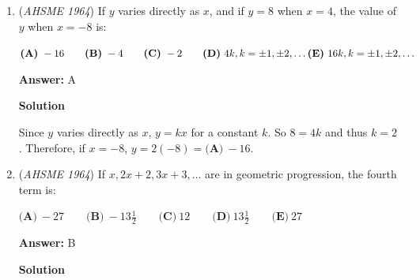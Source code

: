 \begin{enumerate}
 



\textbf{Solution 2}

Notice that $\frac{P+Q}{P-Q} - \frac{P-Q}{P+Q} = \frac{(P+Q)^2 - (P - Q)^2}{(P-Q)(P+Q)} = \frac{(2P)(2Q)}{(P-Q)(P+Q)} = \frac{4PQ}{(P-Q)(P+Q)}$.

 Substituting for $P$ and $Q$ yields $\frac{4(x^2 - y^2)}{(2y)(2x)}=\frac{4(x^2 - y^2)}{4xy} = \boxed{\textbf{(A)} \frac{x^2 - y^2}{xy}}$.

 



\textbf{Solution 3}

If it's true for all values of $x$ and $y$, then it's true for a specific value of $x$ and $y$.  Letting $x=5$ and $y = 4$ gives $P = 9$ and $Q = 1$.  The fraction becomes:

 $\frac{9 + 1}{9 - 1} - \frac{9 - 1}{9 + 1}$
$\frac{10}{8} - \frac{8}{10}$
$\frac{5}{4} - \frac{4}{5}$
$\frac{25}{20} - \frac{16}{20}$
$\frac{9}{20}$

 Plugging in $(x, y) = (5, 4)$ into the answer choices gives $\frac{9}{20}, \frac{9}{40}, 1, \frac{41}{20}, \frac{41}{40}$.  Therefore, the answer is $\boxed{\textbf{(A)}}$



	\item (\textit{AHSME 1964}) If $y$ varies directly as $x$, and if $y=8$ when $x=4$, the value of $y$ when $x=-8$ is:


 $\textbf{(A)}\ -16 \qquad \textbf{(B)}\ -4 \qquad \textbf{(C)}\ -2 \qquad \textbf{(D)}\ 4k, k= \pm1, \pm2, \dots \qquad \\ \textbf{(E)}\ 16k, k=\pm1,\pm2,\dots$

 \textbf{Answer: }A



\textbf{Solution}

Since $y$ varies directly as $x$, $y = kx$ for a constant $k$.  So $8 = 4k$ and thus $k = 2$.  Therefore, if $x = -8$, $y = 2(-8) = \boxed{\textbf{(A)}\ -16}$.

 


	\item (\textit{AHSME 1964}) If $x, 2x+2, 3x+3, \dots$ are in geometric progression, the fourth term is:


 $\textbf{(A)}\ -27 \qquad \textbf{(B)}\ -13\frac{1}{2} \qquad \textbf{(C)}\ 12\qquad \textbf{(D)}\ 13\frac{1}{2}\qquad \textbf{(E)}\ 27$

 \textbf{Answer: }B



\textbf{Solution}


\end{enumerate}
